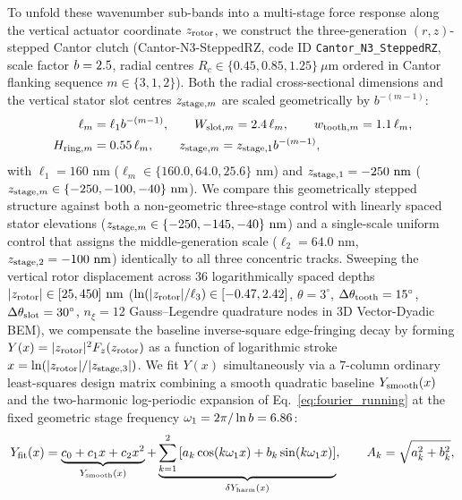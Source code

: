 \documentclass[pdflatex,sn-nature]{sn-jnl}
\DeclareRobustCommand{\roundtwo}[1]{\fpeval{round(#1,2)}}
\begin{document}
To unfold these wavenumber sub-bands into a multi-stage force response along the vertical actuator coordinate $z_{\rm rotor}$, we construct the three-generation $(r,z)$-stepped Cantor clutch (Cantor-N3-SteppedRZ, code ID \texttt{Cantor\_N3\_SteppedRZ}, scale factor $b = 2.5{}$, radial centres $R_c \in \{0.45, 0.85, 1.25\}\ \mu\text{m}$ ordered in Cantor flanking sequence $m \in \{3, 1, 2\}$). Both the radial cross-sectional dimensions and the vertical stator slot centres $z_{{\rm stage},m}$ are scaled geometrically by $b^{-(m-1)}$:
\begin{equation}
\begin{aligned}
\ell_m &= \ell_1 b^{-(m-1)}, \qquad
W_{{\rm slot},m} = 2.4\,\ell_m, \qquad
w_{{\rm tooth},m} = 1.1\,\ell_m, \\
H_{{\rm ring},m} &= 0.55\,\ell_m, \qquad
z_{{\rm stage},m} = z_{{\rm stage},1} b^{-(m-1)},
\end{aligned}
\label{eq:methods_stepped_rz}
\end{equation}
with $\ell_1 = 160\text{ nm}$ ($\ell_m \in \{160.0, 64.0, 25.6\}\text{ nm}$) and $z_{{\rm stage},1} = -250\text{ nm}$ ($z_{{\rm stage},m} \in \{-250, -100, -40\}\text{ nm}$). We compare this geometrically stepped structure against both a non-geometric three-stage control with linearly spaced stator elevations ($z_{{\rm stage},m} \in \{-250, -145, -40\}\text{ nm}$) and a single-scale uniform control that assigns the middle-generation scale ($\ell_2 = 64.0\text{ nm}$, $z_{{\rm stage},2} = -100\text{ nm}$) identically to all three concentric tracks. Sweeping the vertical rotor displacement across $36$ logarithmically spaced depths $|z_{\rm rotor}| \in [25, 450]\text{ nm}$ ($\ln(|z_{\rm rotor}|/\ell_3) \in [-0.47, 2.42]$, $\theta = 3^\circ$, $\Delta\theta_{\rm tooth} = 15^\circ$, $\Delta\theta_{\rm slot} = 30^\circ$, $n_\xi = 12$ Gauss--Legendre quadrature nodes in 3D Vector-Dyadic BEM), we compensate the baseline inverse-square edge-fringing decay by forming $Y(x) = |z_{\rm rotor}|^2 F_z(z_{\rm rotor})$ as a function of logarithmic stroke $x = \ln(|z_{\rm rotor}| / |z_{{\rm stage},3}|)$. We fit $Y(x)$ simultaneously via a $7$-column ordinary least-squares design matrix combining a smooth quadratic baseline $Y_{\rm smooth}(x)$ and the two-harmonic log-periodic expansion of Eq.~\eqref{eq:fourier_running} at the fixed geometric stage frequency $\omega_1 = 2\pi / \ln b = \roundtwo{\LogperSteppedRzOmegaone}$:
\begin{equation}
Y_{\rm fit}(x) = \underbrace{c_0 + c_1 x + c_2 x^2}_{Y_{\rm smooth}(x)} + \underbrace{\sum_{k=1}^{2} \left[ a_k \cos(k \omega_1 x) + b_k \sin(k \omega_1 x) \right]}_{\delta Y_{\rm harm}(x)}, \qquad A_k = \sqrt{a_k^2 + b_k^2},
\label{eq:methods_logper_fit}
\end{equation}
\end{document}
